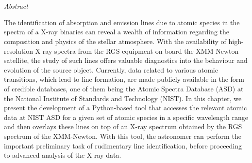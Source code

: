\chapter{\MakeUppercase{\ChapterTitleFive}} \label{chap:tool}
    \minitoc
    
    \newpage
    \begin{center}
    	\emph{Abstract}
    \end{center}
    The identification of absorption and emission lines due to atomic species in the spectra of a X-ray binaries can reveal a wealth of information regarding the composition and physics of the stellar atmosphere. With the availability of high-resolution X-ray spectra from the RGS equipment on-board the XMM-Newton satellite, the study of such lines offers valuable diagnostics into the behaviour and evolution of the source object. Currently, data related to various atomic transitions, which lead to line formation, are made publicly available in the form of credible databases, one of them being the Atomic Spectra Database (ASD) at the National Institute of Standards and Technology (NIST). In this chapter, we present the development of a Python-based tool that accesses the relevant atomic data at NIST ASD for a given set of atomic species in a specific wavelength range and then overlays these lines on top of an X-ray spectrum obtained by the RGS spectrum of the XMM-Newton. With this tool, the astronomer can perform the important preliminary task of rudimentary line identification, before proceeding to advanced analysis of the X-ray data.
    
    \newpage
